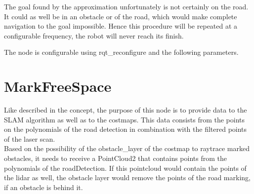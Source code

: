 The goal found by the approximation unfortunately is not certainly on the road. It could as well be in an obstacle or of the road, which would make complete navigation to the goal impossible. Hence this procedure will be repeated at a configurable frequency, the robot will never reach its finish. 

The node is configurable using rqt\_reconfigure and the following parameters.

\begin{table}[H]
\centering
{}

\caption{PoseFinder parameters}
\label{posefinderparams}

\end{table}

\section{MarkFreeSpace}

Like described in the concept, the purpose of this node is to provide data to the SLAM algorithm as well as to the costmaps. This data consists from the points on the polynomials of the road detection in combination with the filtered points of the laser scan.\\

Based on the possibility of the obstacle\_layer of the costmap to raytrace marked obstacles, it needs to receive a PointCloud2 that contains points from the polynomials of the roadDetection. If this pointcloud would contain the points of the lidar as well, the obstacle layer would remove the points of the road marking, if an obstacle is behind it.\\

